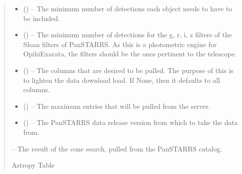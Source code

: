 \documentclass[letterpaper,11pt,english]{sphinxmanual}
\begin{document}
\begin{savenotes}
\begin{fulllineitems}
\begin{savenotes}
\begin{fulllineitems}
\begin{quote}
\begin{description}
\begin{itemize}
\item {} 
\sphinxAtStartPar
{} (\sphinxstyleliteralemphasis{\sphinxupquote{, }}) – The minimum number of detections each object needs to have to be
included.

\item {} 
\sphinxAtStartPar
{} (\sphinxstyleliteralemphasis{\sphinxupquote{, }}) – The minimum number of detections for the g, r, i, z filters of the
Sloan filters of PanSTARRS. As this is a photometric engine for
OpihiExarata, the filters should be the ones pertinent to the
telescope.

\item {} 
\sphinxAtStartPar
{} () – The columns that are desired to be pulled. The purpose of this is
to lighten the data download load. If None, then it defaults to
all columns.

\item {} 
\sphinxAtStartPar
{} (\sphinxstyleliteralemphasis{\sphinxupquote{, }}) – The maximum entries that will be pulled from the server.

\item {} 
\sphinxAtStartPar
{} (\sphinxstyleliteralemphasis{\sphinxupquote{, }}) – The PanSTARRS data release version from which to take the data from.

\end{itemize}

\sphinxAtStartPar
{} – The result of the cone search, pulled from the PanSTARRS catalog.

\sphinxAtStartPar
Astropy Table

\end{description}\end{quote}

\end{fulllineitems}\end{savenotes}


\end{fulllineitems}
\end{savenotes}
\end{document}
